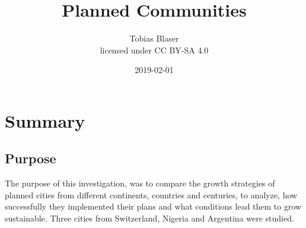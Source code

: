 \documentclass{article}
\title{\vspace{0.5cm}\Huge Planned Communities\vspace{9.5cm}}
\date{2019-02-01}
\author{Tobias Blaser\vspace{0.25cm}\\licensed under CC BY-SA 4.0}
\begin{document}
	
	\maketitle
 	
 	\restoregeometry	
	
	
	
	\clearpage
	\tableofcontents
	
	
	
	\clearpage
	\section{Summary}
		\subsection{Purpose}
		The purpose of this investigation, was to compare the growth strategies of planned cities from different continents, countries and centuries, to analyze, how successfully they implemented their plans and what conditions lead them to grow sustainable. Three cities from Switzerland, Nigeria and Argentina were studied.
		
\end{document}
